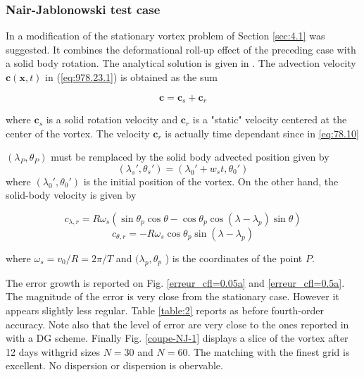 \subsubsection{Nair-Jablonowski test case}

\label{sec:4.2}
In \cite{Nair-Jablonowski} a modification of the stationary vortex problem of Section \ref{sec:4.1} was suggested. It combines 
the deformational roll-up effect of the 
preceding case
with a solid body rotation.
The analytical solution is given in \cite{Nair-Jablonowski}.
The advection velocity $\mathbf{c}(\mathbf{x},t)$ in (\ref{eq:978.23.1}) is obtained as the sum

\begin{equation}
\mathbf{c}=\mathbf{c}_s +\mathbf{c}_r
\end{equation}

where $\mathbf{c}_s$ is a solid rotation velocity and 
$\mathbf{c}_r$ is a "static" velocity centered at the center 
of the vortex. The velocity $\mathbf{c}_r$ is actually time dependant 
since in \eqref{eq:78.10}

$(\lambda_P, \theta_P)$ must be remplaced by the solid body advected position given  by 
\begin{equation}
(\lambda_s', \theta_s') = (\lambda_0' + w_s t, \theta_0')
\end{equation}
where $(\lambda_0', \theta_0')$ is the initial position of the vortex.
On the other hand, the solid-body velocity is given by

\begin{equation}
c_{\lambda, r} = R \omega_s \left( \sin \theta_p \cos \theta - \cos \theta_p \cos ( \lambda - \lambda_p ) \sin \theta \right)
\label{vitesse_lambda_bump}
\end{equation}
\begin{equation}
c_{\theta, r} = - R \omega_s \cos \theta_p \sin ( \lambda - \lambda_p )
\label{vitesse_theta_bump}
\end{equation}

where $\omega_s = v_0 / R = 2 \pi / T $ and $( \lambda_p, \theta_p$ ) is the coordinates of the point $P$.

The error growth is reported on Fig. \ref{erreur_cfl=0.05a}
and \ref{erreur_cfl=0.5a}. The magnitude of the error
is very close from the stationary case. However it appears 
slightly less regular. Table \ref{table:2} reports
as before fourth-order accuracy. Note also that the level
of error are very close to the ones reported in
\cite{Nair-Jablonowski} with a DG scheme. Finally
Fig. \ref{coupe-NJ-1} displays a slice of the vortex after 12 days
withgrid sizes $N=30$ and $N=60$. 
The matching with the finest grid
is excellent. No dispersion or dispersion is obervable.



